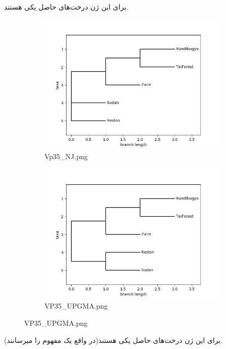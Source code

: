 \documentclass[11pt]{article}
\begin{document}
\newline
برای این ژن درخت‌های حاصل یکی هستند.
\newline
\begin{figure}[H]
  \centering
  \begin{subfigure}[b]{0.4\linewidth}
    \includegraphics[width=\linewidth]{../Data/Trees/VP35_NJ.png}
    \caption{Vp35\_NJ.png}
  \end{subfigure}
  \begin{subfigure}[b]{0.4\linewidth}
    \includegraphics[width=\linewidth]{../Data/Trees/VP35_UPGMA.png}
    \caption{VP35\_UPGMA.png}
  \end{subfigure}
\end{figure}
برای این ژن درخت‌های حاصل یکی هستند(در واقع یک مفهوم را میرسانند).
\end{document}
